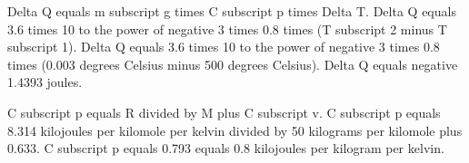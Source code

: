 Delta Q equals m subscript g times C subscript p times Delta T.  
Delta Q equals 3.6 times 10 to the power of negative 3 times 0.8 times (T subscript 2 minus T subscript 1).  
Delta Q equals 3.6 times 10 to the power of negative 3 times 0.8 times (0.003 degrees Celsius minus 500 degrees Celsius).  
Delta Q equals negative 1.4393 joules.  

C subscript p equals R divided by M plus C subscript v.  
C subscript p equals 8.314 kilojoules per kilomole per kelvin divided by 50 kilograms per kilomole plus 0.633.  
C subscript p equals 0.793 equals 0.8 kilojoules per kilogram per kelvin.